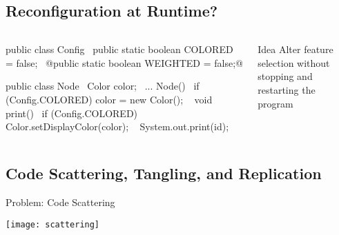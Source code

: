 \subsection{Reconfiguration at Runtime?}
\begin{frame}[fragile]{\myframetitle}
		\begin{columns}
\begin{tiny}
\begin{codetight}{}
public class Config {
	~public static boolean COLORED = false;~
	@public static boolean WEIGHTED = false;@
}

\end{codetight}
\begin{codetight}{}
public class Node {
	~Color color;~
	...
	Node(){
		~if (Config.COLORED) {
			color = new Color();
		}~
	}
	void print() {
		~if (Config.COLORED) {
			Color.setDisplayColor(color);
		}~
		System.out.print(id);
	}
}
\end{codetight}
\end{tiny}	
				\begin{definition}{Idea}
					Alter feature selection without stopping and restarting the program
				\end{definition}
		\end{columns}
\end{frame}


\subsection{Code Scattering, Tangling, and Replication}
\begin{frame}{Problem: Code Scattering }
	\begin{center}
		\vspace{-2mm}
		\texttt{[image: scattering]}
	\end{center}
\end{frame}

